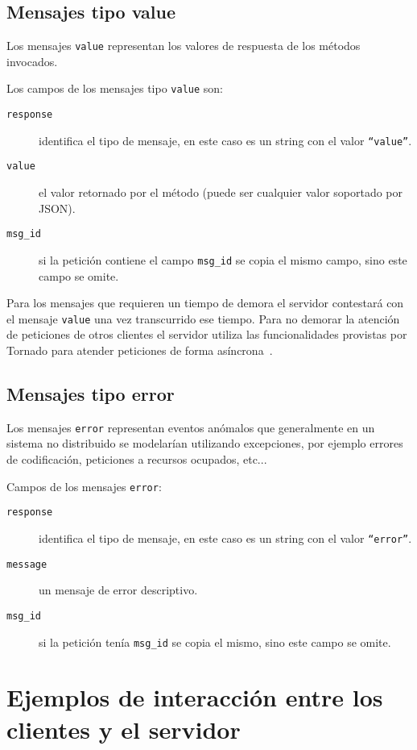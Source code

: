 \subsection{Mensajes tipo value}

Los mensajes \texttt{value} representan los valores de respuesta de
los métodos invocados.

Los campos de los mensajes tipo \texttt{value} son:

\begin{description}
    \item[\texttt{response}] identifica el tipo de mensaje, en este caso
        es un string con el valor \texttt{``value''}.
    \item[\texttt{value}] el valor retornado por el método (puede ser
        cualquier valor soportado por JSON).
    \item[\texttt{msg\_id}] si la petición contiene el campo \texttt{msg\_id} se
        copia el mismo campo, sino este campo se omite.
\end{description}

Para los mensajes que requieren
un tiempo de demora el servidor contestará con el mensaje \texttt{value}
una vez transcurrido ese tiempo. Para no demorar la atención de peticiones
de otros clientes el servidor utiliza las funcionalidades provistas por
Tornado para atender peticiones de forma asíncrona~\citep{dory_2012}.

\subsection{Mensajes tipo error}

Los mensajes \texttt{error} representan eventos anómalos que
generalmente en un sistema no distribuido se modelarían utilizando
excepciones, por ejemplo errores de codificación, peticiones a recursos
ocupados, etc...

Campos de los mensajes \texttt{error}:
\begin{description}
    \item[\texttt{response}] identifica el tipo de mensaje, en este caso
        es un string con el valor \texttt{``error''}.
    \item[\texttt{message}] un mensaje de error descriptivo.
    \item[\texttt{msg\_id}] si la petición tenía \texttt{msg\_id} se
        copia el mismo, sino este campo se omite.
\end{description}


\section{Ejemplos de interacción entre los clientes y el servidor}

